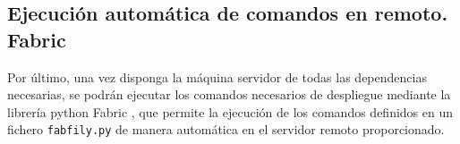 \subsection{Ejecución automática de comandos en remoto. Fabric}
Por último, una vez disponga la máquina servidor de todas las dependencias necesarias, se podrán ejecutar los comandos necesarios de despliegue mediante la librería python Fabric \cite{Fabric}, que permite la ejecución de los comandos definidos en un fichero \texttt{fabfily.py} de manera automática en el servidor remoto proporcionado.

